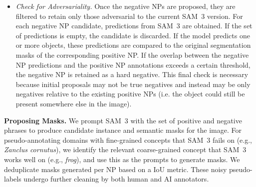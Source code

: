 \documentclass[]{fairmeta}
\newcommand{\eg}{e.g., }
\newcommand{\model}{SAM~3\xspace}
\renewcommand{\paragraph}[1]{%
	\noindent\textbf{#1.}\noindent\xspace%
}
\begin{document}
\begin{itemize}
\begin{itemize}
		\item \textit{Check for Adversariality.} Once the negative NPs are proposed, they are filtered to retain only those adversarial to the current \model version. For each negative NP candidate, predictions from \model are obtained. If the set of predictions is empty, the candidate is discarded. If the model predicts one or more objects, these predictions are compared to the original segmentation masks of the corresponding positive NP. If the overlap between the negative NP predictions and the positive NP annotations exceeds a certain threshold, the negative NP is retained as a hard negative. This final check is necessary because initial proposals may not be true negatives and instead may be only negatives relative to the existing positive NPs (i.e. the object could still be present somewhere else in the image).
	\end{itemize}
	
\end{itemize}

\paragraph{Proposing Masks} We prompt \model with the set of positive and negative phrases to produce candidate instance and semantic masks for the image. For pseudo-annotating domains with fine-grained concepts that \model fails on (\eg \textit{Zanclus cornutus}), we identify the relevant coarse-grained concept that \model works well on (\eg \textit{frog}), and use this as the prompts to generate masks. We deduplicate masks generated per NP based on a IoU metric. These noisy pseudo-labels undergo further cleaning by both human and AI annotators.
\end{document}
